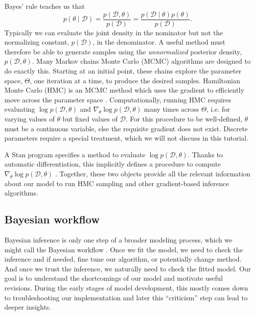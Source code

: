 Bayes' rule teaches us that
\begin{equation*}
  p(\theta \mid \mathcal D) = \frac{p(\mathcal D, \theta)}{p(\mathcal D)} =  \frac{p(\mathcal D \mid \theta) p(\theta)}{p(\mathcal D)}.
\end{equation*}
Typically we can evaluate the joint density in the nominator but not the normalizing constant, $p(\mathcal D)$, in the denominator.
%
A useful method must therefore be able to generate samples using the \textit{unnormalized} posterior density, $p(\mathcal D, \theta)$.
Many Markov chains Monte Carlo (MCMC) algorithms are designed to do exactly this.
Starting at an initial point, these chains explore the parameter space, $\Theta$, one iteration at a time, to produce the desired samples.
%
Hamiltonian Monte Carlo (HMC) is an MCMC method which uses the gradient to efficiently move across the parameter space \cite{Neil:2012; Betancourt:2018}.
Computationally, running HMC requires evaluating $\log p(\mathcal D, \theta)$ and $\nabla_\theta \log p(\mathcal D, \theta)$ many times across $\Theta$, i.e. for varying values of $\theta$ but fixed values of $\mathcal D$.
For this procedure to be well-defined, $\theta$ must be a continuous variable, else the requisite gradient does not exist.
Discrete parameters require a special treatment, which we will not discuss in this tutorial.

A Stan program specifies a method to evaluate $\log p(\mathcal D, \theta)$.
Thanks to automatic differentiation, this implicitly defines a procedure to compute $\nabla_\theta \log p(\mathcal D, \theta)$ \citet{Griewank:2008, author:0000, Margossian:2019}.
Together, these two objects provide all the relevant information about our model to run HMC sampling and other gradient-based inference algorithms.

\subsection{Bayesian workflow}

Bayesian inference is only one step of a broader modeling process, which we might call the Bayesian workflow \cite{Betancourt:2018, Gabry:2019, Gelman:2020}.
Once we fit the model, we need to check the inference and if needed, fine tune our algorithm, or potentially change method.
And once we trust the inference, we naturally need to check the fitted model.
Our goal is to understand the shortcomings of our model and motivate useful revisions.
During the early stages of model development, this mostly comes down to troubleshooting our implementation and later this ``criticism'' step can lead to deeper insights.

